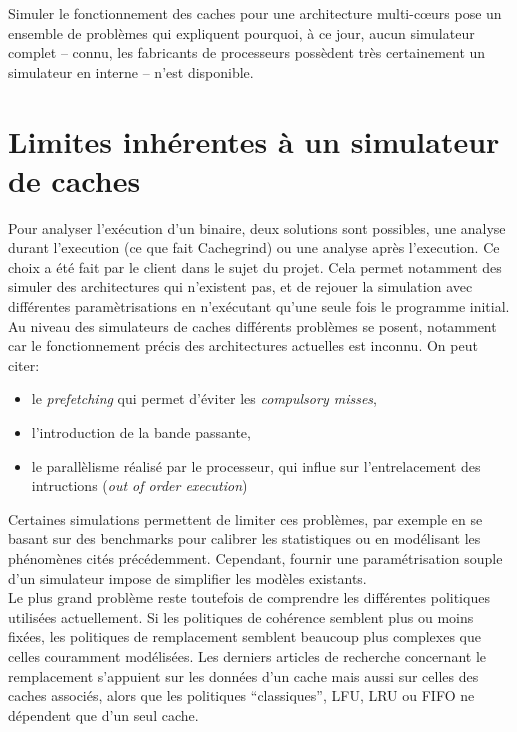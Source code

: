 Simuler le fonctionnement des caches pour une architecture multi-c{\oe}urs pose un ensemble de problèmes qui expliquent pourquoi, à ce jour, aucun simulateur complet -- connu, les fabricants de processeurs possèdent très certainement un simulateur en interne -- n'est disponible. 

\section{Limites inhérentes à un simulateur de caches}
Pour analyser l'exécution d'un binaire, deux solutions sont possibles, une analyse durant l'execution (ce que fait \textsf{Cachegrind}) ou une analyse après l'execution. Ce choix a été fait par le client dans le sujet du projet. Cela permet notamment des simuler des architectures qui n'existent pas, et de rejouer la simulation avec différentes paramètrisations en n'exécutant qu'une seule fois le programme initial. \\

Au niveau des simulateurs de caches différents problèmes se posent, notamment car le fonctionnement précis des architectures actuelles est inconnu. On peut citer:
\begin{itemize}
\item le \emph{prefetching} qui permet d'éviter les \emph{compulsory misses}, 
\item l'introduction de la bande passante, 
\item le parallèlisme réalisé par le processeur, qui influe sur l'entrelacement des intructions (\emph{out of order execution}) \\
\end{itemize}

Certaines simulations permettent de limiter ces problèmes, par exemple en se basant sur des benchmarks pour calibrer les statistiques ou en modélisant les phénomènes cités précédemment. Cependant, fournir une paramétrisation souple d'un simulateur impose de simplifier les modèles existants. \\

Le plus grand problème reste toutefois de comprendre les différentes politiques utilisées actuellement. Si les politiques de cohérence semblent plus ou moins fixées, les politiques de remplacement semblent beaucoup plus complexes que celles couramment modélisées. Les derniers articles de recherche concernant le remplacement s'appuient sur les données d'un cache mais aussi sur celles des caches associés, alors que les politiques ``classiques'', LFU, LRU ou FIFO ne dépendent que d'un seul cache.

